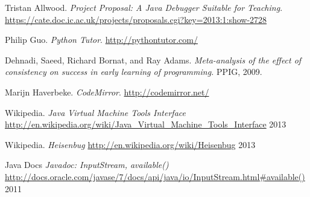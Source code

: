 \documentclass[11pt, a4paper]{article}
\begin{document}
\begin{thebibliography}{9}

	Tristan Allwood.
	\emph{Project Proposal: A Java Debugger Suitable for Teaching}.
	\url{https://cate.doc.ic.ac.uk/projects/proposals.cgi?key=2013:1:show-2728}

	Philip Guo.
	\emph{Python Tutor}.
	\url{http://pythontutor.com/}

	Dehnadi, Saeed, Richard Bornat, and Ray Adams. 
	\emph{Meta-analysis of the effect of consistency on success in early learning of programming.}
	PPIG, 2009.

	Marijn Haverbeke.
	\emph{CodeMirror}.
	\url{http://codemirror.net/}

        Wikipedia.
        \emph{Java Virtual Machine Tools Interface}
        \url{http://en.wikipedia.org/wiki/Java_Virtual_Machine_Tools_Interface}
        2013

        Wikipedia.
        \emph{Heisenbug}
        \url{http://en.wikipedia.org/wiki/Heisenbug}
        2013

        Java Docs
        \emph{Javadoc: InputStream, available()}
        \url{http://docs.oracle.com/javase/7/docs/api/java/io/InputStream.html#available()}
        2011
\end{thebibliography}
\end{document}
